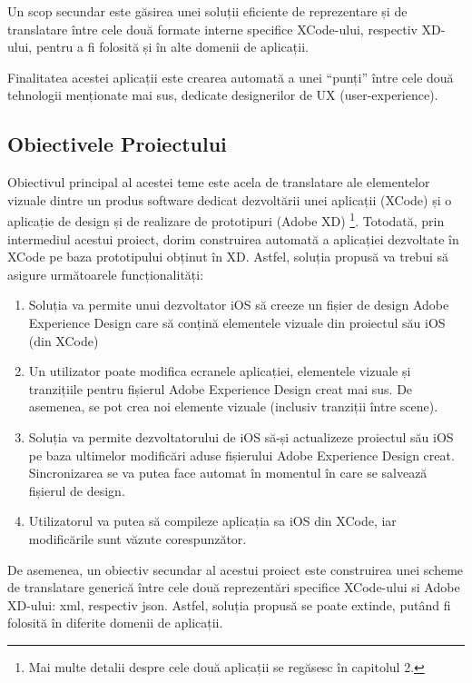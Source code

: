 Un scop secundar este găsirea unei soluții eficiente de reprezentare și de translatare între cele două formate interne specifice XCode-ului, respectiv XD-ului, pentru a fi folosită și în alte domenii de aplicații.

Finalitatea acestei aplicații este crearea automată  a unei “punți” între cele două tehnologii menționate mai sus, dedicate designerilor de UX (user-experience).

\subsection{Obiectivele Proiectului}
\label{sub-sec:proj-objectives}

Obiectivul principal al acestei teme este acela de translatare ale elementelor vizuale dintre un produs software dedicat dezvoltării unei aplicații (XCode) și o aplicație de design și de realizare de prototipuri (Adobe XD) \footnote{Mai multe detalii despre cele două aplicații se regăsesc în capitolul 2.}. Totodată, prin intermediul acestui proiect, dorim construirea automată a aplicației dezvoltate în XCode pe baza prototipului obținut în XD.
Astfel, soluția propusă va trebui să asigure următoarele funcționalități:

\begin{enumerate}
\item Soluția va permite unui dezvoltator iOS să creeze un fișier de design Adobe Experience Design care să conțină elementele vizuale din proiectul său iOS (din XCode)
\item Un utilizator poate modifica ecranele aplicației, elementele vizuale și tranzițiile pentru fișierul Adobe Experience Design creat mai sus. De asemenea, se pot crea noi elemente vizuale (inclusiv tranziții între scene).
\item Soluția va permite dezvoltatorului de iOS să-și actualizeze proiectul său iOS pe baza ultimelor modificări aduse fișierului Adobe Experience Design creat. Sincronizarea se va putea face automat în momentul în care se salvează fișierul de design. 
\item  Utilizatorul va putea să compileze aplicația sa iOS din XCode, iar modificările sunt văzute corespunzător. 
\end{enumerate}

De asemenea, un obiectiv secundar al acestui proiect este construirea unei scheme de translatare generică între cele două reprezentări specifice XCode-ului si Adobe XD-ului: xml, respectiv json.
Astfel, soluția propusă se poate extinde, putând fi folosită în diferite domenii de aplicații.


